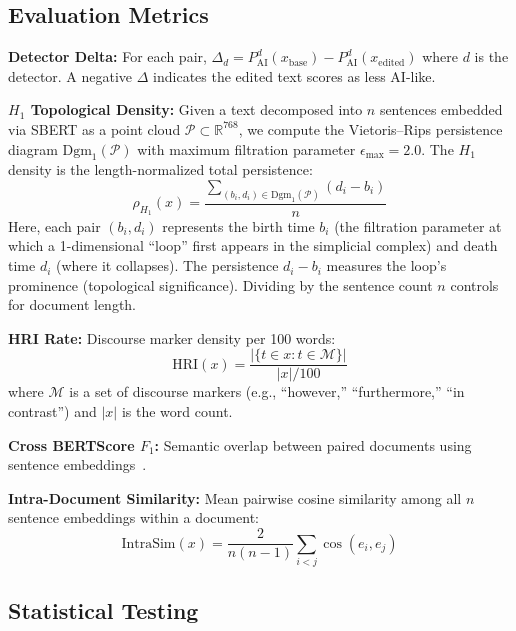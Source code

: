 \documentclass[conference]{IEEEtran}
\begin{document}
\subsection{Evaluation Metrics}

\textbf{Detector Delta:} For each pair, $\Delta_d = P_{\text{AI}}^d(x_{\text{base}}) - P_{\text{AI}}^d(x_{\text{edited}})$ where $d$ is the detector. A negative $\Delta$ indicates the edited text scores as less AI-like.

\textbf{$H_1$ Topological Density:} Given a text decomposed into $n$ sentences embedded via SBERT as a point cloud $\mathcal{P} \subset \mathbb{R}^{768}$, we compute the Vietoris--Rips persistence diagram $\text{Dgm}_1(\mathcal{P})$ with maximum filtration parameter $\epsilon_{\max} = 2.0$. The $H_1$ density is the length-normalized total persistence:
\begin{equation}
    \rho_{H_1}(x) = \frac{\sum_{(b_i, d_i) \in \text{Dgm}_1(\mathcal{P})} (d_i - b_i)}{n}
\end{equation}
Here, each pair $(b_i, d_i)$ represents the birth time $b_i$ (the filtration parameter at which a 1-dimensional ``loop'' first appears in the simplicial complex) and death time $d_i$ (where it collapses). The persistence $d_i - b_i$ measures the loop's prominence (topological significance). Dividing by the sentence count $n$ controls for document length.

\textbf{HRI Rate:} Discourse marker density per 100 words:
\begin{equation}
    \text{HRI}(x) = \frac{|\{t \in x : t \in \mathcal{M}\}|}{|x| / 100}
\end{equation}
where $\mathcal{M}$ is a set of discourse markers (e.g., ``however,'' ``furthermore,'' ``in contrast'') and $|x|$ is the word count.

\textbf{Cross BERTScore $F_1$:} Semantic overlap between paired documents using sentence embeddings~\cite{zhang2020bertscore}.

\textbf{Intra-Document Similarity:} Mean pairwise cosine similarity among all $n$ sentence embeddings within a document:
\begin{equation}
    \text{IntraSim}(x) = \frac{2}{n(n-1)}\sum_{i < j} \cos(e_i, e_j)
\end{equation}

\subsection{Statistical Testing}
\end{document}
